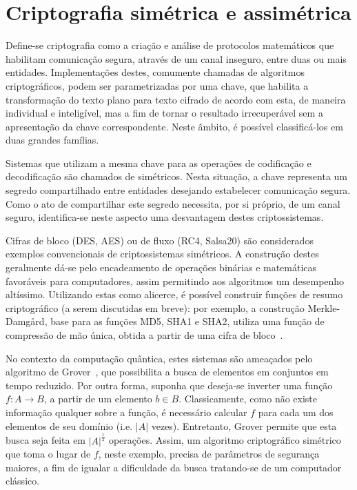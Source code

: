 \documentclass[12pt,notitlepage]{report}
\newcommand{\length}[1]{\vert #1 \vert}
\begin{document}
\section{Criptografia simétrica e assimétrica}

Define-se criptografia como a criação e análise de protocolos
matemáticos que habilitam comunicação segura, através de um canal
inseguro, entre duas ou mais entidades. Implementações destes,
comumente chamadas de algoritmos criptográficos,
podem ser parametrizadas por uma chave, que habilita a transformação
do texto plano para texto cifrado de acordo
com esta, de maneira individual e inteligível, mas a fim de tornar o
resultado irrecuperável sem a apresentação da chave correspondente.
Neste âmbito, é possível classificá-los em duas grandes famílias.

Sistemas que utilizam a mesma chave para as operações de codificação
e decodificação são chamados de simétricos. Nesta situação, a chave
representa um segredo compartilhado entre entidades desejando
estabelecer comunicação segura. Como o ato de compartilhar
este segredo necessita, por si próprio, de um canal seguro,
identifica-se neste aspecto uma desvantagem destes criptossistemas.

Cifras de bloco (DES, AES) ou de fluxo (RC4, Salsa20) são
considerados exemplos convencionais de criptossistemas simétricos.
A construção destes geralmente dá-se pelo encadeamento de operações
binárias e matemáticas favoráveis para computadores, assim permitindo
aos algoritmos um desempenho altíssimo. Utilizando estas como alicerce,
é possível construir funções de resumo criptográfico (a serem discutidas
em breve): por exemplo, a construção Merkle-Damgård, base para as funções
MD5, SHA1 e SHA2, utiliza uma função de compressão de mão única, obtida
a partir de uma cifra de bloco~\cite[9.41]{Menezes:1996:HAC:548089}.

No contexto da computação quântica, estes sistemas são ameaçados
pelo algoritmo de Grover~\cite{Grover:1996:FQM:237814.237866}, que
possibilita a busca de elementos em conjuntos em tempo reduzido.
Por outra forma, suponha que deseja-se inverter uma função $f : A
\longrightarrow B$, a partir de um elemento $b \in B$. Classicamente,
como não existe informação qualquer sobre a função, é necessário
calcular $f$ para cada um dos elementos de seu domínio (i.e. $\length{A}$
vezes). Entretanto, Grover permite que esta busca seja feita em
$\length{A}^{\frac{1}{2}}$ operações. Assim, um algoritmo criptográfico simétrico
que toma o lugar de $f$, neste exemplo, precisa de parâmetros de segurança
maiores, a fim de igualar a dificuldade da busca tratando-se de um
computador clássico.
\end{document}
